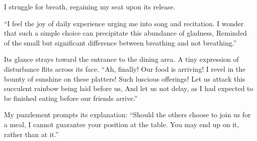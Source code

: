 I struggle for breath, regaining my seat upon its release.

``I feel the joy of daily experience urging me into song and recitation.
I wonder that such a simple choice can precipitate this abundance of
gladness,
Reminded of the small but significant difference between breathing and
not breathing.''

Its glance strays toward the entrance to the dining area. A tiny
expression of disturbance flits across its face.
``Ah, finally! Our food is arriving!
I revel in the bounty of sunshine on these platters! Such luscious
offerings!
Let us attack this succulent rainbow being laid before us,
And let us not delay, as I had expected to be finished eating before our
friends arrive.''

My puzzlement prompts its explanation: 
``Should the others choose to join us for a meal, I cannot guarantee your
position at the table. You may end up on it, rather than at it.''
